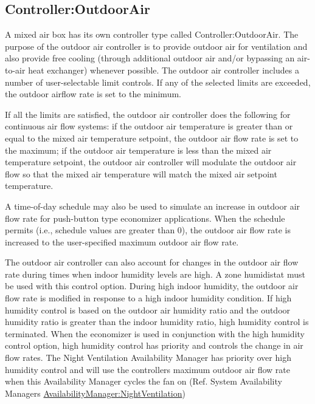 \subsection{Controller:OutdoorAir}\label{controlleroutdoorair}

A mixed air box has its own controller type called Controller:OutdoorAir. The purpose of the outdoor air controller is to provide outdoor air for ventilation and also provide free cooling (through additional outdoor air and/or bypassing an air-to-air heat exchanger) whenever possible. The outdoor air controller includes a number of user-selectable limit controls. If any of the selected limits are exceeded, the outdoor airflow rate is set to the minimum.

If all the limits are satisfied, the outdoor air controller does the following for continuous air flow systems: if the outdoor air temperature is greater than or equal to the mixed air temperature setpoint, the outdoor air flow rate is set to the maximum; if the outdoor air temperature is less than the mixed air temperature setpoint, the outdoor air controller will modulate the outdoor air flow so that the mixed air temperature will match the mixed air setpoint temperature.

A time-of-day schedule may also be used to simulate an increase in outdoor air flow rate for push-button type economizer applications. When the schedule permits (i.e., schedule values are greater than 0), the outdoor air flow rate is increased to the user-specified maximum outdoor air flow rate.

The outdoor air controller can also account for changes in the outdoor air flow rate during times when indoor humidity levels are high. A zone humidistat must be used with this control option. During high indoor humidity, the outdoor air flow rate is modified in response to a high indoor humidity condition. If high humidity control is based on the outdoor air humidity ratio and the outdoor humidity ratio is greater than the indoor humidity ratio, high humidity control is terminated. When the economizer is used in conjunction with the high humidity control option, high humidity control has priority and controls the change in air flow rates. The Night Ventilation Availability Manager has priority over high humidity control and will use the controllers maximum outdoor air flow rate when this Availability Manager cycles the fan on (Ref. System Availability Managers \hyperref[availabilitymanagernightventilation]{AvailabilityManager:NightVentilation})

